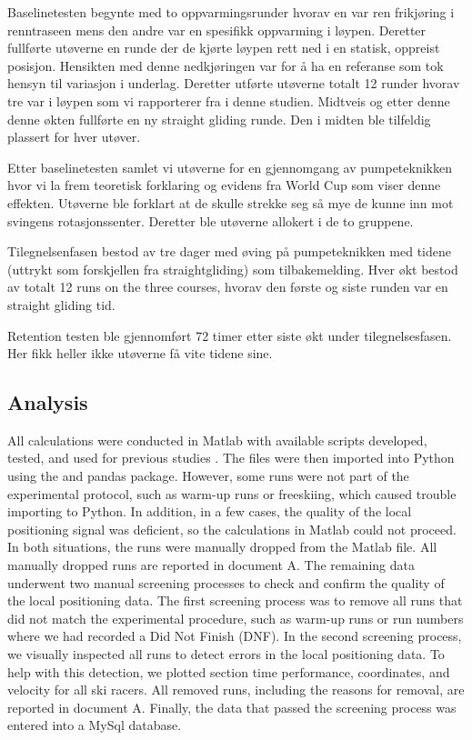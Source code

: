 \documentclass{article}
\begin{document}
 






Baselinetesten begynte med to oppvarmingsrunder hvorav en var ren frikjøring i renntraseen mens den andre var en spesifikk oppvarming i løypen. Deretter fullførte utøverne en runde der de kjørte løypen rett ned i en statisk, oppreist posisjon. Hensikten med denne nedkjøringen var for å ha en referanse som tok hensyn til variasjon i underlag. Deretter utførte utøverne totalt 12 runder hvorav tre var i løypen som vi rapporterer fra i denne studien. Midtveis og etter denne denne økten fullførte en ny straight gliding runde. Den i midten ble tilfeldig plassert for hver utøver.

Etter baselinetesten samlet vi utøverne for en gjennomgang av pumpeteknikken hvor vi la frem teoretisk forklaring og evidens fra World Cup som viser denne effekten. Utøverne ble forklart at de skulle strekke seg så mye de kunne inn mot svingens rotasjonssenter. Deretter ble utøverne allokert i de to gruppene.

Tilegnelsenfasen bestod av tre dager med øving på pumpeteknikken med tidene (uttrykt som forskjellen fra straightgliding) som tilbakemelding. Hver økt bestod av totalt 12 runs on the three courses, hvorav den første og siste runden var en straight gliding tid. 

Retention testen ble gjennomført 72 timer etter siste økt under tilegnelsesfasen. Her fikk heller ikke utøverne få vite tidene sine. 



\subsection{Analysis}


All calculations were conducted in Matlab with available scripts developed, tested, and used for previous studies \cite{reidKinematicKineticStudy2010}. The files were then imported into Python using the  \cite{2020SciPy-NMeth} and pandas \cite{reback2020pandas} package. However, some runs were not part of the experimental protocol, such as warm-up runs or freeskiing, which caused trouble importing to Python. In addition, in a few cases, the quality of the local positioning signal was deficient, so the calculations in Matlab could not proceed. In both situations, the runs were manually dropped from the Matlab file. All manually dropped runs are reported in document A. The remaining data underwent two manual screening processes to check and confirm the quality of the local positioning data. The first screening process was to remove all runs that did not match the experimental procedure, such as warm-up runs or run numbers where we had recorded a Did Not Finish (DNF). In the second screening process, we visually inspected all runs to detect errors in the local positioning data. To help with this detection, we plotted section time performance, coordinates, and velocity for all ski racers. All removed runs, including the reasons for removal, are reported in document A. Finally, the data that passed the screening process was entered into a MySql database.
\end{document}
